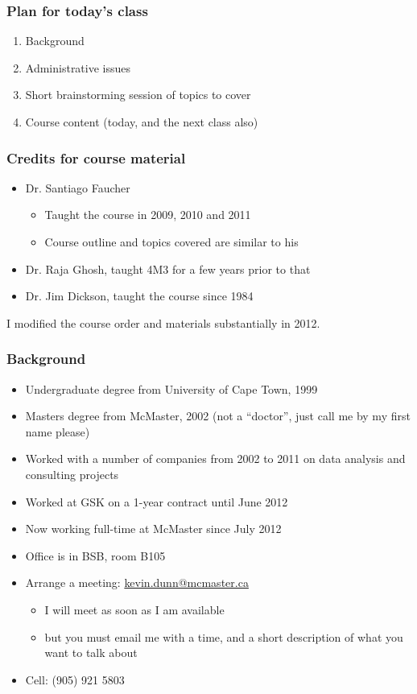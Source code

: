 
\begin{frame}\frametitle{Plan for today's class}
	\begin{enumerate}
		\item	Background
		\item	Administrative issues
		\item	Short brainstorming session of topics to cover
		\item	Course content (today, and the next class also)
	\end{enumerate}
\end{frame}

\begin{frame}\frametitle{Credits for course material}

	\begin{itemize}
		\item	Dr. Santiago Faucher
		\begin{itemize}
			\item	Taught the course in 2009, 2010 and 2011
			\item	Course outline and topics covered are similar to his
		\end{itemize}
		\item	Dr. Raja Ghosh, taught 4M3 for a few years prior to that
		\item	Dr. Jim Dickson, taught the course since 1984
	\end{itemize}
	
	\vspace{12pt}
	I modified the course order and materials substantially in 2012.%
\end{frame}

\begin{frame}\frametitle{Background}
	{\color{myGreen}{About myself}}
	\begin{itemize}
		\item	Undergraduate degree from University of Cape Town, 1999
		\item	Masters degree from McMaster, 2002 (not a ``doctor'', just call me by my first name please)
		\item	Worked with a number of companies from 2002 to 2011 on data analysis and consulting projects
		\item	Worked at GSK on a 1-year contract until June 2012
		\item	Now working full-time at McMaster since July 2012
		\item	Office is in BSB, room B105
		\item	Arrange a meeting: \url{kevin.dunn@mcmaster.ca}
			\begin{itemize}
				\item	I will meet as soon as I am available
				\item	but you must email me with a time, and a short description of what you want to talk about
			\end{itemize}
		\item	Cell: (905) 921 5803
	\end{itemize}
\end{frame}


